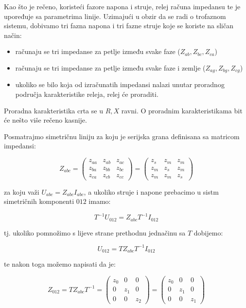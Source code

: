 Kao što je rečeno, koristeći fazore napona i struje, relej računa impedansu te je upoređuje sa parametrima linije. Uzimajući u obzir da se radi o trofaznom sistemu, dobivamo tri fazna napona i tri fazne struje koje se koriste na sličan način:

\begin{itemize}
    \item računaju se tri impedanse za petlje između svake faze ($Z_{ab}, Z_{bc}, Z_{ca}$)
    \item računaju se tri impedanse za petlje između svake faze i zemlje ($Z_{ag}, Z_{bg}, Z_{cg}$)
    \item ukoliko se bilo koja od izračunatih impedansi nalazi unutar proradnog područja karakteristike releja, relej će proraditi. 
\end{itemize}

Proradna karakteristika crta se u ${R, X}$ ravni. O proradnim karakteristikama bit će nešto više rečeno kasnije.

Posmatrajmo simetričnu liniju za koju je serijska grana definisana sa matricom impedansi:

\[Z_{abc}=\begin{pmatrix} z_{aa} & z_{ab} & z_{ac} \\
z_{ba} & z_{bb} & z_{bc} \\
z_{ca} & z_{cb} & z_{cc} \end{pmatrix} = \begin{pmatrix}  z_{s} & z_{m} & z_{m} \\
z_{m} & z_{s} & z_{m} \\
z_{m} & z_{m} & z_{s} \end{pmatrix}\]

za koju važi $U_{abc}=Z_{abc}I_{abc}$, a ukoliko struje i napone prebacimo u sistm simetričnih komponenti $012$ imamo:

\[T^{-1}U_{012}=Z_{abc}T^{-1}I_{012}\] 

tj. ukoliko pomnožimo s lijeve strane prethodnu jednačinu sa $T$ dobijemo:

\[U_{012}=TZ_{abc}T^{-1}I_{012}\]

te nakon toga možemo napisati da je:

\[Z_{012}=TZ_{abc}T^{-1}=\begin{pmatrix} z_{0} & 0 & 0 \\
0 & z_{1} & 0 \\
0 & 0 & z_{2} \end{pmatrix} = \begin{pmatrix}  z_{0} & 0 & 0 \\
0 & z_{1} & 0 \\
0 & 0 & z_{1} \end{pmatrix}\]

